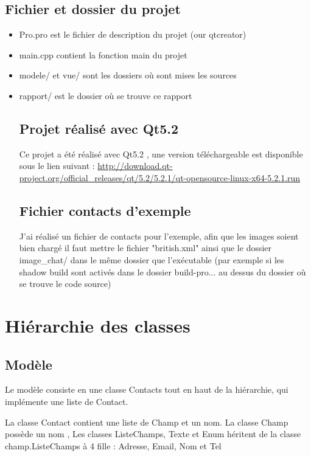 \documentclass{report}
\begin{document}
\section{Fichier et dossier du projet}
\begin{itemize}
\item Pro.pro est le fichier de description du projet (our qtcreator)
\item main.cpp contient la fonction main du projet
\item modele/ et vue/ sont les dossiers où sont mises les sources
\item rapport/ est le dossier où se trouve ce rapport

\section{Projet réalisé avec Qt5.2}
Ce projet a été réalisé avec Qt5.2 , une version téléchargeable est disponible sous le lien suivant : 
\url{http://download.qt-project.org/official_releases/qt/5.2/5.2.1/qt-opensource-linux-x64-5.2.1.run}

\section{Fichier contacts d'exemple}
J'ai réalisé un fichier de contacts pour l'exemple, afin que les images soient bien chargé il faut mettre le fichier "british.xml" ainsi que le dossier image\_chat/ dans le même dossier que l'exécutable (par exemple si les shadow build sont activés dans le dossier build-pro... au dessus du dossier où se trouve le code source)



\end{itemize}

\chapter{Hiérarchie des classes}
\section{Modèle}
Le modèle consiste en une classe Contacts tout en haut de la hiérarchie, qui
implémente une liste de Contact. 

La classe Contact contient une liste de Champ et un nom. La classe Champ possède un nom , Les classes ListeChamps, Texte et Enum héritent de la classe champ.ListeChamps à 4 fille : Adresse, Email, Nom et Tel 
\end{document}
